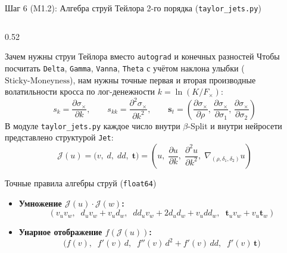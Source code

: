\documentclass[aspectratio=169, 9pt]{beamer}
\begin{document}
\begin{frame}{Шаг 6 (M1.2): Алгебра струй Тейлора 2-го порядка (\texttt{taylor\_jets.py})}
  \begin{columns}[T]
    \begin{column}{0.52\textwidth}
      \begin{block}{Зачем нужны струи Тейлора вместо \texttt{autograd} и конечных разностей}
        Чтобы посчитать \texttt{Delta}, \texttt{Gamma}, \texttt{Vanna}, \texttt{Theta} с учётом наклона улыбки ($\text{Sticky-Moneyness}$), нам нужны точные первая и вторая производные волатильности кросса по лог-денежности $k = \ln(K/F_\times)$:
        $$s_k = \frac{\partial \sigma_\times}{\partial k}, \qquad s_{kk} = \frac{\partial^2 \sigma_\times}{\partial k^2}, \qquad \bm{s}_t = \left(\frac{\partial \sigma_\times}{\partial \rho},\, \frac{\partial \sigma_\times}{\partial \sigma_1},\, \frac{\partial \sigma_\times}{\partial \sigma_2}\right)$$
        В модуле \texttt{taylor\_jets.py} каждое число внутри $\beta$-Split и внутри нейросети представлено структурой \texttt{Jet}:
        $$\mathcal{J}(u) = \big(v,\; d,\; dd,\; \bm{t}\big) = \left(u,\; \frac{\partial u}{\partial k},\; \frac{\partial^2 u}{\partial k^2},\; \nabla_{(\rho, \delta_1, \delta_2)} u\right)$$
      \end{block}

      \begin{block}{Точные правила алгебры струй (\texttt{float64})}
        \begin{itemize}
          \item \textbf{Умножение $\mathcal{J}(u) \cdot \mathcal{J}(w)$:}
            $$(v_u v_w,\;\; d_u v_w + v_u d_w,\;\; dd_u v_w + 2 d_u d_w + v_u dd_w,\;\; \bm{t}_u v_w + v_u \bm{t}_w)$$
          \item \textbf{Унарное отображение $f(\mathcal{J}(u))$:}
            $$\big(f(v),\;\; f'(v)\, d,\;\; f''(v)\, d^2 + f'(v)\, dd,\;\; f'(v)\, \bm{t}\big)$$
        \end{itemize}
      \end{block}
    \end{column}


\end{columns}
\end{frame}
\end{document}
